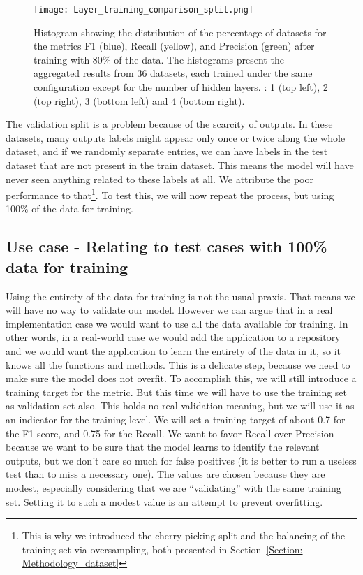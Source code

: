\documentclass[a4paper, 11pt]{report}
\begin{document}
    \begin{figure}[ht!]
        \centering
        \texttt{[image: Layer\_training\_comparison\_split.png]}
        \caption[Performance by layer count - train and validate]{Histogram showing the distribution of the percentage of datasets for the metrics F1 (blue), Recall (yellow), and Precision (green) after training with 80\% of the data. The histograms present the aggregated results from 36 datasets, each trained under the same configuration except for the number of hidden layers. : 1 (top left), 2 (top right), 3 (bottom left) and 4 (bottom right).}
        \label{fig: layer_performance_split}
    \end{figure}
    The validation split is a problem because of the scarcity of outputs. In these datasets, many outputs labels might appear only once or twice along the whole dataset, and if we randomly separate entries, we can have labels in the test dataset that are not present in the train dataset. This means the model will have never seen anything related to these labels at all. We attribute the poor performance to that\footnote{This is why we introduced the cherry picking split and the balancing of the training set via oversampling, both presented in Section~\ref{Section: Methodology_dataset}}. To test this, we will now repeat the process, but using 100\% of the data for training.

    \subsection{Use case - Relating to test cases with 100\% data for training}
    Using the entirety of the data for training is not the usual praxis. That means we will have no way to validate our model. However we can argue that in a real implementation case we would want to use all the data available for training. In other words, in a real-world case we would add the application to a repository and we would want the application to learn the entirety of the data in it, so it knows all the functions and methods. This is a delicate step, because we need to make sure the model does not overfit. To accomplish this, we will still introduce a training target for the metric. But this time we will have to use the training set as validation set also. This holds no real validation meaning, but we will use it as an indicator for the training level. We will set a training target of about 0.7 for the F1 score, and 0.75 for the Recall. We want to favor Recall over Precision because we want to be sure that the model learns to identify the relevant outputs, but we don't care so much for false positives (it is better to run a useless test than to miss a necessary one). The values are chosen because they are modest, especially considering that we are ``validating'' with the same training set. Setting it to such a modest value is an attempt to prevent overfitting.
\end{document}
